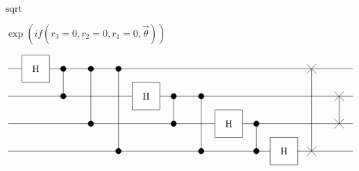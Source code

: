 \documentclass{article}
\begin{document}
$\text{sqrt}$
\pagebreak

$\exp(i f(r_3=0,r_2=0,r_1=0, \vec{\theta}))$
\pagebreak

\[
            \begin{tikzpicture}[scale=.5]
            \draw (-2, 5) -- (23, 5);
            \draw (-2, 3) -- (23, 3);
            \draw (-2, 1) -- (23, 1);
            \draw (-2, -1) -- (23, -1);

            \draw[fill=white] (-1, 4) -- (-1, 6) -- (1, 6) -- (1,4) -- cycle;
            \node[draw=none] at (0, 5) {H};

            \draw(2, 5) -- (2, 3);
            \draw[fill=black] (2, 5) circle (.2);
            \draw[fill=black] (2, 3) circle (.2);
            \draw(4, 5) -- (4, 1);
            \draw[fill=black] (4, 5) circle (.2);
            \draw[fill=black] (4, 1) circle (.2);
            \draw(6, 5) -- (6, -1);
            \draw[fill=black] (6, 5) circle (.2);
            \draw[fill=black] (6, -1) circle (.2);

            \draw[fill=white] (-1+8, 4-2) -- (-1+8, 6-2) -- (1+8, 6-2) -- (1+8,4-2) -- cycle;
            \node[draw=none] at (8, 5-2) {H};

            \draw(10, 5-2) -- (10, 3-2);
            \draw[fill=black] (10, 5-2) circle (.2);
            \draw[fill=black] (10, 3-2) circle (.2);
            \draw(12, 5-2) -- (12, 3-4);
            \draw[fill=black] (12, 5-2) circle (.2);
            \draw[fill=black] (12, 3-4) circle (.2);

            \draw[fill=white] (-1+8+6, 4-4) -- (-1+8+6, 6-4) -- (1+8+6, 6-4) -- (1+8+6,4-4) -- cycle;
            \node[draw=none] at (8+6, 5-4) {H};

            \draw(16, 5-2-2) -- (16, 3-4);
            \draw[fill=black] (16, 5-2-2) circle (.2);
            \draw[fill=black] (16, 3-4) circle (.2);

            \draw[fill=white] (-1+8+6+4, 4-4-2) -- (-1+8+6+4, 6-4-2) -- (1+8+6+4, 6-4-2) -- (1+8+6+4,4-4-2) -- cycle;
            \node[draw=none] at (8+6+4, 5-4-2) {H};

            \draw (20, 5) -- (20, -1);
            \draw (20 - .35, 5 + .35) -- (20 + .35, 5 - .35);
            \draw (20 - .35, 5 - .35) -- (20 + .35, 5 + .35);
            \draw (20 - .35, -1 + .35) -- (20 + .35, -1 - .35);
            \draw (20 - .35, -1 - .35) -- (20 + .35, -1 + .35);
            \draw (22, 3) -- (22, 1);
            \draw (22 - .35, 3 + .35) -- (22 + .35, 3 - .35);
            \draw (22 - .35, 3 - .35) -- (22 + .35, 3 + .35);
            \draw (22 - .35, 1 + .35) -- (22 + .35, 1 - .35);
            \draw (22 - .35, 1 - .35) -- (22 + .35, 1 + .35);
            \end{tikzpicture}
\]
\pagebreak
\end{document}
